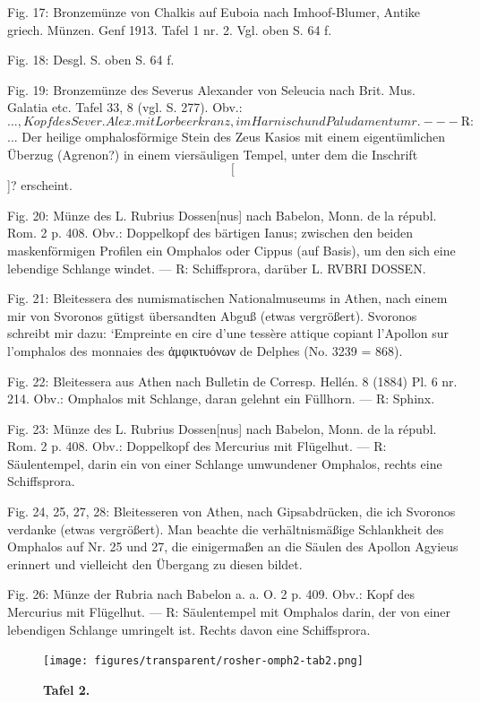 \documentclass[a4paper, 11pt, oneside]{article}
\newcommand*\svgABX{}
\newcommand*\svgABY{}
\newcommand*\svgABZ{}
\newcommand*\svgACA{}
\newcommand*\svgACB{}
\begin{document}
Fig. 17: Bronzemünze von Chalkis auf Euboia nach Imhoof-Blumer, Antike griech. Münzen. Genf 1913. Tafel 1 nr. 2. Vgl. oben S. 64 f.

Fig. 18: Desgl. S. oben S. 64 f.

Fig. 19: Bronzemünze des Severus Alexander von Seleucia nach Brit. Mus. Galatia etc. Tafel 33, 8 (vgl. S. 277). Obv.: $\svgABX\svgABY$..., Kopf des Sever. Alex. mit Lorbeerkranz, im Harnisch und Paludamentum r. --- ℞: $\svgABZ$... Der heilige omphalosförmige Stein des Zeus Kasios mit einem eigentümlichen Überzug (Agrenon?) in einem viersäuligen Tempel, unter dem die Inschrift $\svgACA$[$\svgACB$]? erscheint.

Fig. 20: Münze des L. Rubrius Dossen[nus] nach Babelon, Monn. de la républ. Rom. 2 p. 408. Obv.: Doppelkopf des bärtigen Ianus; zwischen den beiden maskenförmigen Profilen ein Omphalos oder Cippus (auf Basis), um den sich eine lebendige Schlange windet. --- ℞: Schiffsprora, darüber L. RVBRI DOSSEN.

Fig. 21: Bleitessera des numismatischen Nationalmuseums in Athen, nach einem mir von Svoronos gütigst übersandten Abguß (etwas vergrößert). Svoronos schreibt mir dazu: `Empreinte en cire d'une tessère attique copiant l'Apollon sur l'omphalos des monnaies des ἀμφικτυόνων de Delphes (No. 3239 = 868).

Fig. 22: Bleitessera aus Athen nach Bulletin de Corresp. Hellén. 8 (1884) Pl. 6 nr. 214. Obv.: Omphalos mit Schlange, daran gelehnt ein Füllhorn. --- ℞: Sphinx.

Fig. 23: Münze des L. Rubrius Dossen[nus] nach Babelon, Monn. de la républ. Rom. 2 p. 408. Obv.: Doppelkopf des Mercurius mit Flügelhut. --- ℞: Säulentempel, darin ein von einer Schlange umwundener Omphalos, rechts eine Schiffsprora.

Fig. 24, 25, 27, 28: Bleitesseren von Athen, nach Gipsabdrücken, die ich Svoronos verdanke (etwas vergrößert). Man beachte die verhältnismäßige Schlankheit des Omphalos auf Nr. 25 und 27, die einigermaßen an die Säulen des Apollon Agyieus erinnert und vielleicht den Übergang zu diesen bildet.

Fig. 26: Münze der Rubria nach Babelon a. a. O. 2 p. 409. Obv.: Kopf des Mercurius mit Flügelhut. --- ℞: Säulentempel mit Omphalos darin, der von einer lebendigen Schlange umringelt ist. Rechts davon eine Schiffsprora.
\clearpage
\vspace*{\fill}
\begin{figure}[H]
\centering
\texttt{[image: figures/transparent/rosher-omph2-tab2.png]}
\caption{\bfseries Tafel 2.}
\end{figure}
\vspace*{\fill}
\clearpage
\end{document}
